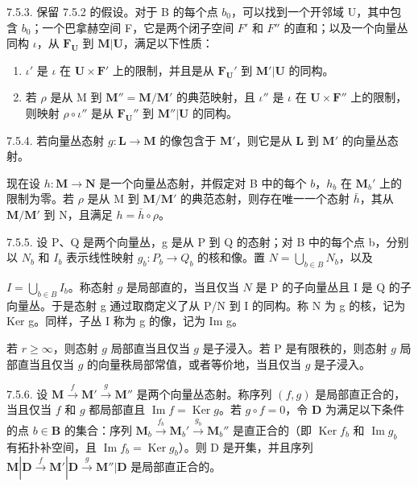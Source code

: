 7.5.3. 保留 7.5.2 的假设。对于 B 的每个点 \(b_0\)，可以找到一个开邻域 U，其中包含 \(b_0\)；一个巴拿赫空间 F，它是两个闭子空间 \(F'\) 和 \(F''\) 的直和；以及一个向量丛同构 \(\iota\)，从 \(\mathbf{F}_{\mathbf{U}}\) 到 \(\mathbf{M}|\mathbf{U}\)，满足以下性质：

\begin{enumerate}
\def\labelenumi{(\roman{enumi})}
\item
  \(\iota'\) 是 \(\iota\) 在 \(\mathbf{U} \times \mathbf{F}'\) 上的限制，并且是从 \(\mathbf{F}_{\mathbf{U}}'\) 到 \(\mathbf{M}'|\mathbf{U}\) 的同构。
\item
  若 \(\rho\) 是从 M 到 \(\mathbf{M}'' = \mathbf{M} / \mathbf{M}'\) 的典范映射，且 \(\iota''\) 是 \(\iota\) 在 \(\mathbf{U} \times \mathbf{F}''\) 上的限制，则映射 \(\rho \circ \iota''\) 是从 \(\mathbf{F}_{\mathbf{U}}''\) 到 \(\mathbf{M}''|\mathbf{U}\) 的同构。
\end{enumerate}

7.5.4. 若向量丛态射 \(g: \mathbf{L} \to \mathbf{M}\) 的像包含于 \(\mathbf{M}'\)，则它是从 \(\mathbf{L}\) 到 \(\mathbf{M}'\) 的向量丛态射。

现在设 \(h: \mathbf{M} \to \mathbf{N}\) 是一个向量丛态射，并假定对 B 中的每个 \(b\)，\(h_b\) 在 \(\mathbf{M}_b'\) 上的限制为零。若 \(\rho\) 是从 M 到 \(\mathbf{M}/\mathbf{M}'\) 的典范态射，则存在唯一一个态射 \(\bar{h}\)，其从 \(\mathbf{M}/\mathbf{M}'\) 到 N，且满足 \(h = \bar{h} \circ \rho\)。

7.5.5. 设 P、Q 是两个向量丛，g 是从 P 到 Q 的态射；对 B 中的每个点 b，分别以 \(N_{b}\) 和 \(I_{b}\) 表示线性映射 \(g_{b}:P_{b}\to Q_{b}\) 的核和像。置 \(N=\bigcup_{b\in B}N_{b}\)，以及

\(I = \bigcup_{b \in B} I_b\)。称态射 \(g\) 是局部直的，当且仅当 \(N\) 是 P 的子向量丛且 I 是 Q 的子向量丛。于是态射 g 通过取商定义了从 P/N 到 I 的同构。称 N 为 g 的核，记为 Ker g。同样，子丛 I 称为 g 的像，记为 Im g。

若 \(r \geqslant \infty\)，则态射 \(g\) 局部直当且仅当 \(g\) 是子浸入。若 P 是有限秩的，则态射 \(g\) 局部直当且仅当 \(g\) 的向量秩局部常值，或者等价地，当且仅当 \(g\) 是子浸入。

7.5.6. 设 \(\mathbf{M} \xrightarrow{f} \mathbf{M}' \xrightarrow{g} \mathbf{M}''\) 是两个向量丛态射。称序列 \((f, g)\) 是局部直正合的，当且仅当 \(f\) 和 \(g\) 都局部直且 \(\operatorname{Im} f = \operatorname{Ker} g\)。若 \(g \circ f = 0\)，令 \(\mathbf{D}\) 为满足以下条件的点 \(b \in \mathbf{B}\) 的集合：序列 \(\mathbf{M}_b \xrightarrow{f_b} \mathbf{M}_b' \xrightarrow{g_b} \mathbf{M}_b''\) 是直正合的（即 \(\operatorname{Ker} f_b\) 和 \(\operatorname{Im} g_b\) 有拓扑补空间，且 \(\operatorname{Im} f_b = \operatorname{Ker} g_b\)）。则 D 是开集，并且序列 \(\mathbf{M}|\mathbf{D} \xrightarrow{f} \mathbf{M}'|\mathbf{D} \xrightarrow{g} \mathbf{M}''|\mathbf{D}\) 是局部直正合的。


